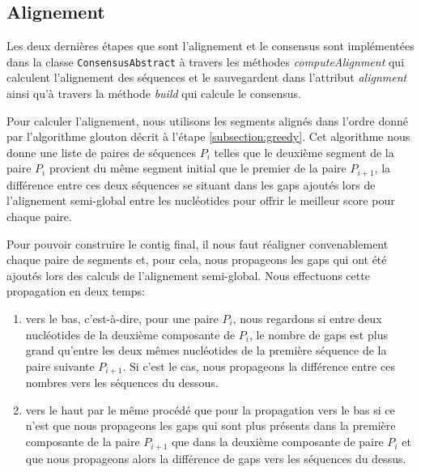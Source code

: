 
\subsection{Alignement}
\label{subsection:alignment}

Les deux dernières étapes que sont l'alignement et le consensus sont
implémentées dans la classe \verb|ConsensusAbstract| à travers les méthodes
\emph{computeAlignment} qui calculent l'alignement des séquences et le sauvegardent
dans l'attribut \emph{alignment} ainsi qu'à travers la méthode \emph{build}
qui calcule le consensus.

Pour calculer l'alignement, nous utilisons les segments alignés dans l'ordre
donné par l'algorithme glouton décrit à l'étape \ref{subsection:greedy}.
Cet algorithme nous donne une liste de paires de séquences $P_{i}$ telles
que le deuxième segment de la paire $P_{i}$ provient du même segment initial que
le premier de la paire $P_{i + 1}$, la différence entre ces deux séquences se
situant dans les gaps ajoutés lors de l'alignement semi-global entre les
nucléotides pour offrir le meilleur score pour chaque paire.


Pour pouvoir construire le contig final, il nous faut réaligner convenablement
chaque paire de segments et, pour cela, nous propageons les gaps qui ont été
ajoutés lors des calculs de l'alignement semi-global. Nous effectuons cette
propagation en deux temps:

\begin{enumerate}
	\item vers le bas, c'est-à-dire, pour une paire $P_{i}$, nous regardons si
		entre deux nucléotides de la deuxième composante de $P_{i}$, le nombre
		de gaps est plus grand qu'entre les deux mêmes nucléotides de la
		première séquence de la paire suivante $P_{i + 1}$. Si c'est le cas,
		nous propageons la différence entre ces nombres vers les séquences du
		dessous.
	\item vers le haut par le même procédé que pour la propagation vers le bas
		si ce n'est que nous propageons les gaps qui sont plus présents dans la
		première composante de la paire $P_{i + 1}$ que dans la deuxième
		composante de paire $P_{i}$ et que nous propageons alors la différence
		de gaps vers les séquences du dessus.
\end{enumerate}


